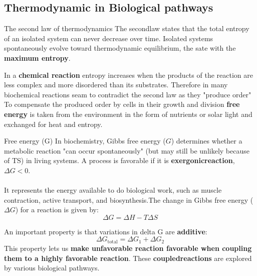 \documentclass[../main.tex]{subfiles}
\begin{document}
\subsection{Thermodynamic in Biological pathways}
\begin{DefWithTitle}{The second law of thermodynamics}
	The \gls{secondlaw} states that the total entropy of an isolated system can never decrease over time. Isolated systems spontaneously evolve toward thermodynamic equilibrium, the sate with the \textbf{maximum \gls{entropy}}.
\end{DefWithTitle}
In a \textbf{chemical reaction} entropy increases when the products of the reaction are less complex and more disordered than its substrates. Therefore in many biochemical reactions seam to contradict the second law as they "produce order"\\
To compensate the produced order by cells in their growth and division \textbf{free energy} is taken from the environment in the form of nutrients or solar light and exchanged for heat and entropy.
 
\begin{DefWithTitle}{Free energy (G)}
	In biochemistry, Gibbs free energy (\(G\)) determines whether a metabolic reaction "can occur spontaneously" (but may still be unlikely because of TS) in living systems. A process is favorable if it is \textbf{\gls{exergonicreaction}}, \(\Delta G < 0\). \\
	\\
	It represents the energy available to do biological work, such as muscle contraction, active transport, and biosynthesis.The change in Gibbs free energy (\(\Delta G\)) for a reaction is given by:
	\[
	\Delta G = \Delta H - T \Delta S
	\]
\end{DefWithTitle} 
An important property is that variations in delta G are \textbf{additive}:
\[
\Delta G_{\text{total}} = \Delta G_1 + \Delta G_2
\]
This property lets us \textbf{make unfavorable reaction favorable when coupling them to a highly favorable reaction}. These \textbf{\gls{coupledreactions}} are explored by various biological pathways.


\end{document}

